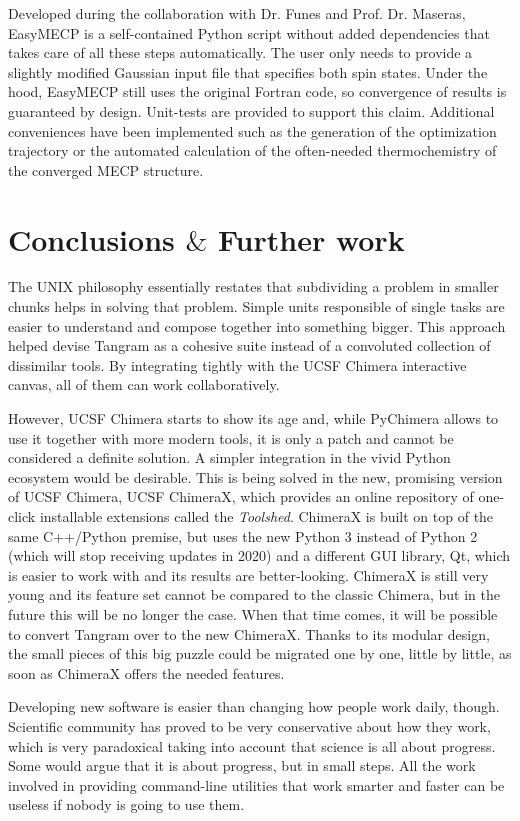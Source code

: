 Developed during the collaboration with Dr. Funes and Prof. Dr. Maseras, EasyMECP is a self-contained Python script without added dependencies that takes care of all these steps automatically. The user only needs to provide a slightly modified Gaussian input file that specifies both spin states. Under the hood, EasyMECP still uses the original Fortran code, so convergence of results is guaranteed by design. Unit-tests are provided to support this claim. Additional conveniences have been implemented such as the generation of the optimization trajectory or the automated calculation of the often-needed thermochemistry of the converged MECP structure.

\section{Conclusions $\&$  Further work}
The UNIX philosophy essentially restates that subdividing a problem in smaller chunks helps in solving that problem. Simple units responsible of single tasks are easier to understand and compose together into something bigger. This approach helped devise Tangram as a cohesive suite instead of a convoluted collection of dissimilar tools. By integrating tightly with the UCSF Chimera interactive canvas, all of them can work collaboratively.

However, UCSF Chimera starts to show its age and, while PyChimera allows to use it together with more modern tools, it is only a patch and cannot be considered a definite solution. A simpler integration in the vivid Python ecosystem would be desirable. This is being solved in the new, promising version of UCSF Chimera, UCSF ChimeraX,\cite{chimerax} which provides an online repository of one-click installable extensions called the \textit{Toolshed}. ChimeraX is built on top of the same C++/Python premise, but uses the new Python 3 instead of Python 2 (which will stop receiving updates in 2020) and a different GUI library, Qt, which is easier to work with and its results are better-looking. ChimeraX is still very young and its feature set cannot be compared to the classic Chimera, but in the future this will be no longer the case. When that time comes, it will be possible to convert Tangram over to the new ChimeraX. Thanks to its modular design, the small pieces of this big puzzle could be migrated one by one, little by little, as soon as ChimeraX offers the needed features.

Developing new software is easier than changing how people work daily, though. Scientific community has proved to be very conservative about how they work, which is very paradoxical taking into account that science is all about progress. Some would argue that it is about progress, but in small steps. All the work involved in providing command-line utilities that work smarter and faster can be useless if nobody is going to use them.

